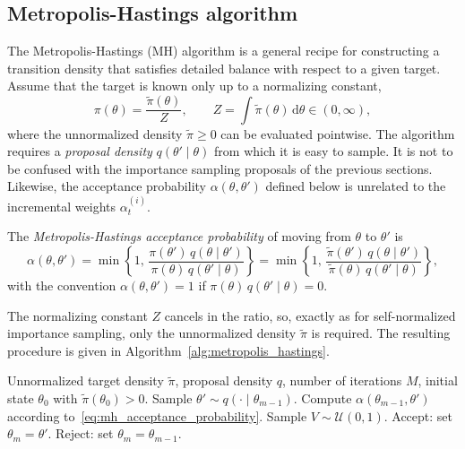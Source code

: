 \subsection{Metropolis-Hastings algorithm}
\label{sec:metropolis_hastings}
The Metropolis-Hastings (MH) algorithm \cite{metropolis1953equation,hastings1970monte} is a general recipe for constructing a transition density that satisfies detailed balance with respect to a given target. Assume that the target is known only up to a normalizing constant,
\begin{equation}
    \pi(\theta) = \frac{\tilde{\pi}(\theta)}{Z}, \qquad Z = \int \tilde{\pi}(\theta)\,\mathrm{d}\theta \in (0,\infty),
\end{equation}
where the unnormalized density $\tilde{\pi}\ge 0$ can be evaluated pointwise. The algorithm requires a \emph{proposal density} $q(\theta'\mid\theta)$ from which it is easy to sample. It is not to be confused with the importance sampling proposals of the previous sections. Likewise, the acceptance probability $\alpha(\theta,\theta')$ defined below is unrelated to the incremental weights $\alpha_t^{(i)}$.

\begin{definition}
    \label{def:mh_acceptance_probability}
    The \emph{Metropolis-Hastings acceptance probability} of moving from $\theta$ to $\theta'$ is
    \begin{equation}
        \alpha(\theta,\theta') = \min\left\{1,\, \frac{\pi(\theta')\,q(\theta\mid\theta')}{\pi(\theta)\,q(\theta'\mid\theta)}\right\} = \min\left\{1,\, \frac{\tilde{\pi}(\theta')\,q(\theta\mid\theta')}{\tilde{\pi}(\theta)\,q(\theta'\mid\theta)}\right\},
        \label{eq:mh_acceptance_probability}
    \end{equation}
    with the convention $\alpha(\theta,\theta') = 1$ if $\pi(\theta)\,q(\theta'\mid\theta) = 0$.
\end{definition}

The normalizing constant $Z$ cancels in the ratio, so, exactly as for self-normalized importance sampling, only the unnormalized density $\tilde{\pi}$ is required. The resulting procedure is given in Algorithm~\ref{alg:metropolis_hastings}.

\begin{algorithm}
\caption{Metropolis-Hastings}
\label{alg:metropolis_hastings}
\begin{algorithmic}[1]
    \REQUIRE Unnormalized target density $\tilde{\pi}$, proposal density $q$, number of iterations $M$, initial state $\theta_0$ with $\tilde{\pi}(\theta_0)>0$.
        \STATE Sample $\theta' \sim q(\cdot\mid\theta_{m-1})$.
        \STATE Compute $\alpha(\theta_{m-1},\theta')$ according to~\eqref{eq:mh_acceptance_probability}.
        \STATE Sample $V \sim \mathcal{U}(0,1)$.
            \STATE Accept: set $\theta_m = \theta'$.
        \ELSE
            \STATE Reject: set $\theta_m = \theta_{m-1}$.
        \ENDIF
    \ENDFOR
\end{algorithmic}
\end{algorithm}

